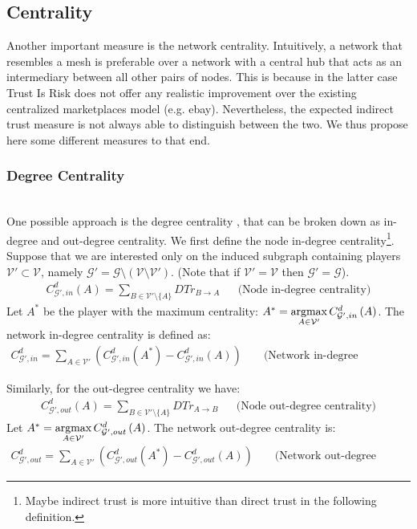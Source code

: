 \subsection{Centrality}
  Another important measure is the network centrality. Intuitively, a network that resembles a mesh is preferable over a
  network with a central hub that acts as an intermediary between all other pairs of nodes. This is because in the latter case
  Trust Is Risk does not offer any realistic improvement over the existing centralized marketplaces model (e.g. ebay).
  Nevertheless, the expected indirect trust measure is not always able to distinguish between the two. We thus propose here
  some different measures to that end.
  
  \subsubsection{Degree Centrality} \ \\

    One possible approach is the degree centrality \cite{freeman}, that can be broken down as in-degree and out-degree
    centrality. We first define the node in-degree centrality\footnote{Maybe indirect trust is more intuitive than direct
    trust in the following definition.}. Suppose that we are interested only on the induced subgraph containing players
    $\mathcal{V}' \subset \mathcal{V}$, namely $\mathcal{G}' = \mathcal{G} \setminus \left(\mathcal{V} \setminus
    \mathcal{V}'\right)$. (Note that if $\mathcal{V}' = \mathcal{V}$ then $\mathcal{G}' = \mathcal{G}$).
    \begin{align*}
      C^d_{\mathcal{G}', in}\left(A\right) = \sum\limits_{B \in \mathcal{V}' \setminus \{A\}}DTr_{B \rightarrow A} && \mbox{
      (Node in-degree centrality)}
    \end{align*}
    Let $A^*$ be the player with the maximum centrality: $A^* = \operatorname*{argmax}\limits_{A \in \mathcal{V}'}C^d_{\mathcal{G}',
    in}\left(A\right)$.  The network in-degree centrality is defined as:
    \begin{align*}
      C^d_{\mathcal{G}', in} = \sum\limits_{A \in \mathcal{V}'}\left(C^d_{\mathcal{G}', in}\left(A^*\right) -
      C^d_{\mathcal{G}', in}\left(A\right)\right) && \mbox{ (Network in-degree centrality)}
    \end{align*}
    \addtocounter{footnote}{-1}
    Similarly, for the out-degree centrality we have\footnotemark:
    \begin{align*}
      C^d_{\mathcal{G}', out}\left(A\right) = \sum\limits_{B \in \mathcal{V}' \setminus \{A\}}DTr_{A \rightarrow B} && \mbox{
      (Node out-degree centrality)}
    \end{align*}
    Let $A^* = \operatorname*{argmax}\limits_{A \in \mathcal{V}'}C^d_{\mathcal{G}', out}\left(A\right)$. The network out-degree centrality is:
    \begin{align*}
      C^d_{\mathcal{G}', out} = \sum\limits_{A \in \mathcal{V}'}\left(C^d_{\mathcal{G}', out}\left(A^*\right) -
      C^d_{\mathcal{G}', out}\left(A\right)\right) && \mbox{ (Network out-degree centrality)}
    \end{align*}

